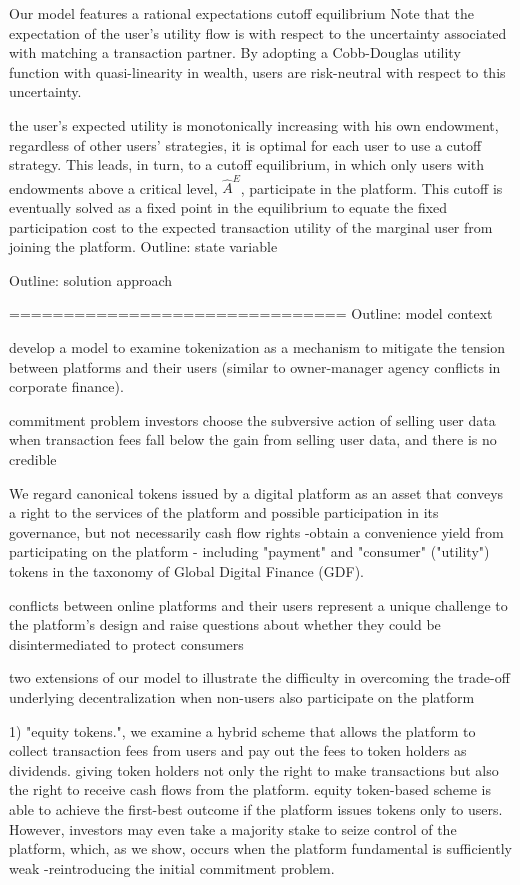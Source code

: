         Our model features a rational expectations cutoff equilibrium Note that the expectation of the user's utility flow is with respect to the uncertainty associated with matching a transaction partner. By adopting a Cobb-Douglas utility function with quasi-linearity in wealth, users are risk-neutral with respect to this uncertainty.

        the user's expected utility is monotonically increasing with his own endowment, regardless of other users' strategies, it is optimal for each user to use a cutoff strategy.  This leads, in turn, to a cutoff equilibrium, in which only users with endowments above a critical level, $\hat{A}^{E}$, participate in the platform. This cutoff is eventually solved as a fixed point in the equilibrium to equate the fixed participation cost to the expected transaction utility of the marginal user from joining the platform. Outline: state variable

        Outline: solution approach

               ===============================
        Outline: model context

        develop a model to examine tokenization as a mechanism to mitigate the tension between platforms and their users (similar to owner-manager agency conflicts in corporate finance).

        commitment problem investors choose the subversive action of selling user data when transaction fees fall below the gain from selling user data, and there is no credible

        We regard canonical tokens issued by a digital platform as an asset that conveys a right to the services of the platform and possible participation in its governance, but not necessarily cash flow rights -obtain a convenience yield from participating on the platform - including "payment" and "consumer" ("utility") tokens in the taxonomy of Global Digital Finance (GDF).

        conflicts between online platforms and their users represent a unique challenge to the platform's design and raise questions about whether they could be disintermediated to protect consumers

        two extensions of our model to illustrate the difficulty in overcoming the trade-off underlying decentralization when non-users also participate on the platform
               
               1) "equity tokens.", we examine a hybrid scheme that allows the platform to collect transaction fees from users and pay out the fees to token holders as dividends. giving token holders not only the right to make transactions but also the right to receive cash flows from the platform. equity token-based scheme is able to achieve the first-best outcome if the platform issues tokens only to users. However, investors may even take a majority stake to seize control of the platform, which, as we show, occurs when the platform fundamental is sufficiently weak -reintroducing the initial commitment problem. 
               
